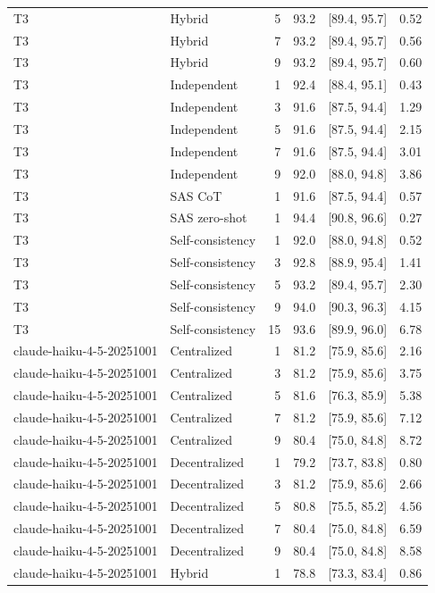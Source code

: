 \begin{tabular}{@{}llrrrr@{}}
T3 & Hybrid & 5 & 93.2 & [89.4, 95.7] & 0.52 \\
T3 & Hybrid & 7 & 93.2 & [89.4, 95.7] & 0.56 \\
T3 & Hybrid & 9 & 93.2 & [89.4, 95.7] & 0.60 \\
T3 & Independent & 1 & 92.4 & [88.4, 95.1] & 0.43 \\
T3 & Independent & 3 & 91.6 & [87.5, 94.4] & 1.29 \\
T3 & Independent & 5 & 91.6 & [87.5, 94.4] & 2.15 \\
T3 & Independent & 7 & 91.6 & [87.5, 94.4] & 3.01 \\
T3 & Independent & 9 & 92.0 & [88.0, 94.8] & 3.86 \\
T3 & SAS CoT & 1 & 91.6 & [87.5, 94.4] & 0.57 \\
T3 & SAS zero-shot & 1 & 94.4 & [90.8, 96.6] & 0.27 \\
T3 & Self-consistency & 1 & 92.0 & [88.0, 94.8] & 0.52 \\
T3 & Self-consistency & 3 & 92.8 & [88.9, 95.4] & 1.41 \\
T3 & Self-consistency & 5 & 93.2 & [89.4, 95.7] & 2.30 \\
T3 & Self-consistency & 9 & 94.0 & [90.3, 96.3] & 4.15 \\
T3 & Self-consistency & 15 & 93.6 & [89.9, 96.0] & 6.78 \\
claude-haiku-4-5-20251001 & Centralized & 1 & 81.2 & [75.9, 85.6] & 2.16 \\
claude-haiku-4-5-20251001 & Centralized & 3 & 81.2 & [75.9, 85.6] & 3.75 \\
claude-haiku-4-5-20251001 & Centralized & 5 & 81.6 & [76.3, 85.9] & 5.38 \\
claude-haiku-4-5-20251001 & Centralized & 7 & 81.2 & [75.9, 85.6] & 7.12 \\
claude-haiku-4-5-20251001 & Centralized & 9 & 80.4 & [75.0, 84.8] & 8.72 \\
claude-haiku-4-5-20251001 & Decentralized & 1 & 79.2 & [73.7, 83.8] & 0.80 \\
claude-haiku-4-5-20251001 & Decentralized & 3 & 81.2 & [75.9, 85.6] & 2.66 \\
claude-haiku-4-5-20251001 & Decentralized & 5 & 80.8 & [75.5, 85.2] & 4.56 \\
claude-haiku-4-5-20251001 & Decentralized & 7 & 80.4 & [75.0, 84.8] & 6.59 \\
claude-haiku-4-5-20251001 & Decentralized & 9 & 80.4 & [75.0, 84.8] & 8.58 \\
claude-haiku-4-5-20251001 & Hybrid & 1 & 78.8 & [73.3, 83.4] & 0.86 \\

\end{tabular}
